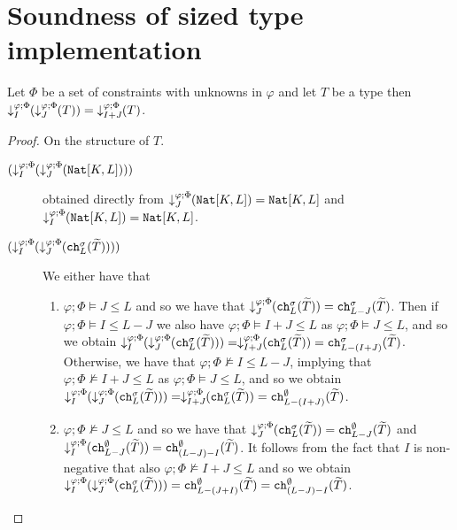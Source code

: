 \chapter{Soundness of sized type implementation}\label{app:sizedtypesoundness}
\setcounter{theorem}{10}


\begin{lemma}
Let $\Phi$ be a set of constraints with unknowns in $\varphi$ and let $T$ be a type then $\susume{\susume{T}{\varphi}{\Phi}{J}}{\varphi}{\Phi}{I} =\; \susume{T}{\varphi}{\Phi}{I+J}$.
\begin{proof} On the structure of $T$.
    \begin{description}
    \item[$(\susume{\susume{\texttt{Nat}[K,L]}{\varphi}{\Phi}{J}}{\varphi}{\Phi}{I})$] obtained directly from  $\susume{\texttt{Nat}[K,L]}{\varphi}{\Phi}{J} = \texttt{Nat}[K,L]$ and $\susume{\texttt{Nat}[K,L]}{\varphi}{\Phi}{I} = \texttt{Nat}[K,L]$.
    \item[$(\susume{\susume{\texttt{ch}^\sigma_L(\widetilde{T})}{\varphi}{\Phi}{J}}{\varphi}{\Phi}{I})$] We either have that
    \begin{enumerate}
        \item $\varphi;\Phi\vDash J \leq L$ and so we have that $\susume{\texttt{ch}^\sigma_L(\widetilde{T})}{\varphi}{\Phi}{J}=\texttt{ch}^\sigma_{L-J}(\widetilde{T})$. Then if $\varphi;\Phi\vDash I \leq L-J$ we also have $\varphi;\Phi\vDash I+J \leq L$ as $\varphi;\Phi\vDash J \leq L$, and so we obtain $\susume{\susume{\texttt{ch}^\sigma_L(\widetilde{T})}{\varphi}{\Phi}{J}}{\varphi}{\Phi}{I}=\susume{\texttt{ch}^\sigma_L(\widetilde{T})}{\varphi}{\Phi}{I+J}=\texttt{ch}^\sigma_{L-(I+J)}(\widetilde{T})$. Otherwise, we have that $\varphi;\Phi\nvDash I \leq L-J$, implying that $\varphi;\Phi\nvDash I+J \leq L$ as $\varphi;\Phi\vDash J \leq L$, and so we obtain $\susume{\susume{\texttt{ch}^\sigma_L(\widetilde{T})}{\varphi}{\Phi}{J}}{\varphi}{\Phi}{I}=\susume{\texttt{ch}^\sigma_L(\widetilde{T})}{\varphi}{\Phi}{I+J}=\texttt{ch}^\emptyset_{L-(I+J)}(\widetilde{T})$.
        \item $\varphi;\Phi\nvDash J \leq L$ and so we have that $\susume{\texttt{ch}^\sigma_L(\widetilde{T})}{\varphi}{\Phi}{J}=\texttt{ch}^\emptyset_{L-J}(\widetilde{T})$ and $\susume{\texttt{ch}^\emptyset_{L-J}(\widetilde{T})}{\varphi}{\Phi}{I}=\texttt{ch}^\emptyset_{(L-J)-I}(\widetilde{T})$. It follows from the fact that $I$ is non-negative that also $\varphi;\Phi\nvDash I+J \leq L$ and so we obtain $\susume{\susume{\texttt{ch}^\sigma_L(\widetilde{T})}{\varphi}{\Phi}{J}}{\varphi}{\Phi}{I}=\texttt{ch}^\emptyset_{L-(J+I)}(\widetilde{T})=\texttt{ch}^\emptyset_{(L-J)-I}(\widetilde{T})$.

\end{enumerate}
\end{description}
\end{proof}
\end{lemma}
